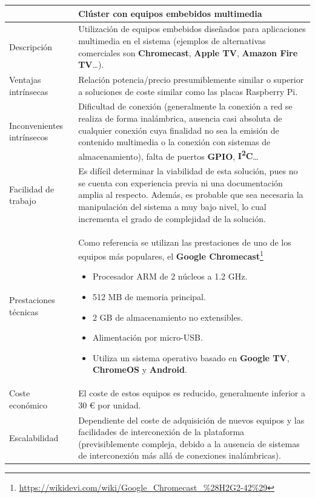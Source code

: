 \begin{table}
\begin{tabular}{|p{2.3cm}|p{12cm}|}
\hline
&\textbf{Clúster con equipos embebidos multimedia}\\
\hline
Descripción&Utilización de equipos embebidos diseñados para aplicaciones multimedia en el sistema (ejemplos de alternativas comerciales son \textbf{Chromecast}, \textbf{Apple TV}, \textbf{Amazon Fire TV}\dots).\\
\hline
Ventajas intrínsecas&Relación potencia/precio presumiblemente similar o superior a soluciones de coste similar como las placas Raspberry Pi.\\
\hline
Inconvenientes intrínsecos&Dificultad de conexión (generalmente la conexión a red se realiza de forma inalámbrica, ausencia casi absoluta de cualquier conexión cuya finalidad no sea la emisión de contenido multimedia o la conexión con sistemas de almacenamiento), falta de puertos \textbf{GPIO}, \textbf{I\textsuperscript{2}C}\dots\\
\hline
Facilidad de trabajo&Es difícil determinar la viabilidad de esta solución, pues no se cuenta con experiencia previa ni una documentación amplia al respecto. Además, es probable que sea necesaria la manipulación del sistema a muy bajo nivel, lo cual incrementa el grado de complejidad de la solución.\\
\hline
Prestaciones técnicas&Como referencia se utilizan las prestaciones de uno de los equipos más populares, el \textbf{Google Chromecast}\footnote{\href{https://wikidevi.com/wiki/Google\_Chromecast\_\%28H2G2-42\%29}{https://wikidevi.com/wiki/Google\_Chromecast\_\%28H2G2-42\%29}}
\begin{itemize}
  \item Procesador ARM de 2 núcleos a 1.2 GHz.
  \item 512 MB de memoria principal.
  \item 2 GB de almacenamiento no extensibles.
  \item Alimentación por micro-USB.
  \item Utiliza un sistema operativo basado en \textbf{Google TV}, \textbf{ChromeOS} y \textbf{Android}.
\end{itemize}\\
\hline
Coste económico&El coste de estos equipos es reducido, generalmente inferior a 30 € por unidad.\\
\hline
Escalabilidad&Dependiente del coste de adquisición de nuevos equipos y las facilidades de interconexión de la plataforma (previsiblemente compleja, debido a la ausencia de sistemas de interconexión más allá de conexiones inalámbricas).\\

\end{tabular}
\end{table}
